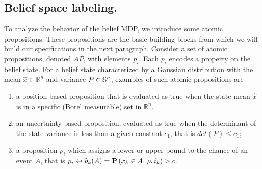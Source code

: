 \documentclass{ifacconf}
\renewcommand{\axx}[1]{{\color{orange} Ali: #1}}
\newcommand{\new}[1]{{\color{blue}#1}}
\begin{document}
	\subsection{Belief space labeling.}\label{sec:DTL}  
\new{To analyze the behavior of the belief MDP, we introduce some atomic propositions. These propositions are the basic building blocks from which we will build our specifications in the next paragraph.  Consider a set of atomic propositions, denoted $AP$, with elements $p_i$. Each $p_i$ encodes a property on the belief state.  }  
For a belief state characterized by  a Gaussian distribution with the mean $\hat x\in \mathbb R^n $ and variance $P\in\S^n$, examples of such atomic propositions are  
     \begin{enumerate}
         \item a position based proposition that is evaluated as true when the  state mean $\hat{x}$ is in a specific (Borel measurable) set  in $\mathbb R^n $. %
 	\item an uncertainty based proposition, evaluated as true when the determinant of the state variance is less than a given constant $c_1$, that is   $det(P)\leq c_1$;  %
	\item \new{ a proposition $ p_i$ which assigns a lower or upper bound to  the chance of an event $A$,  that is $ p_i \leftrightarrow b_k(A)=\po\left(x_k\in A{\,\mid\,}\rho, i_k\right)>c$. }
    \end{enumerate}
\end{document}

